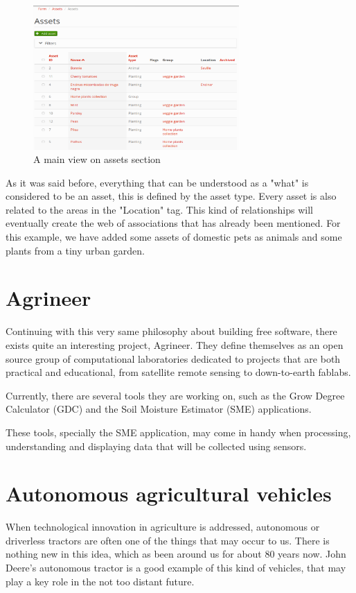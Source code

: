\begin{figure}[htp]
    \centering
    \includegraphics[width=0.70\textwidth]{fig/assets.png}
    \caption{A main view on assets section}
    \label{fig:farmos}
\end{figure}
As it was said before, everything that can be understood as a "what" is considered to be an asset, this is defined by the asset type. Every asset is also related to the areas in the "Location" tag. This kind of relationships will eventually create the web of associations that has already been mentioned. For this example, we have added some assets of domestic pets as animals and some plants from a tiny urban garden.

\section{Agrineer}
Continuing with this very same philosophy about building free software, there exists quite an interesting project, Agrineer. They define themselves as an open source group of computational laboratories dedicated to projects that are both practical and educational, from satellite remote sensing to down-to-earth fablabs\cite{agrineer}.

Currently, there are several tools they are working on, such as the Grow Degree Calculator (GDC) and the Soil Moisture Estimator (SME) applications.

These tools, specially the SME application, may come in handy when processing, understanding and displaying data that will be collected using sensors.


\section{Autonomous agricultural vehicles}
When technological innovation in agriculture is addressed, autonomous or driverless tractors are often one of the things that may occur to us. There is nothing new in this idea, which as been around us for about 80 years now. John Deere's autonomous tractor\cite{deere-tractor} is a good example of this kind of vehicles, that may play a key role in the not too distant future.

